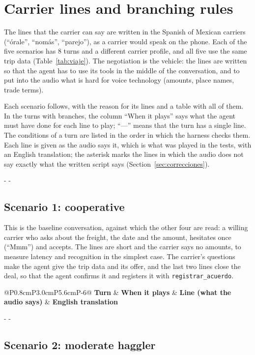 \documentclass[11pt]{article}
\makeatletter
\newcommand{\need}[1]{\par\penalty-100\begingroup
  \setlength{\dimen@}{#1}%
  \dimen@ii\pagegoal \advance\dimen@ii-\pagetotal
  \ifdim\dimen@>\dimen@ii \ifdim\dimen@ii>\z@\vfil\fi \penalty-\@M \fi
  \endgroup}
\newenvironment{scripttable}[2]{%
\begin{table}[H]
\centering
\caption{#1}
\label{#2}
\footnotesize
\renewcommand{\arraystretch}{1.15}
\setlength{\tabcolsep}{4pt}
\begin{tabular}{@{}P{0.8cm}P{3.0cm}P{5.6cm}P{\dimexpr\linewidth-9.4cm-6\tabcolsep\relax}@{}}
\toprule
\textbf{Turn} & \textbf{When it plays} & \textbf{Line (what the audio says)} & \textbf{English translation}\\
\midrule}{%
\bottomrule
\end{tabular}
\end{table}}
\makeatother
\begin{document}
\section{Carrier lines and branching rules}
\label{sec:lineas}

The \RGuionLineas{} lines that the carrier can say are written in the Spanish of
Mexican carriers (``órale'', ``nomás'', ``parejo''), as a carrier would speak on the
phone. Each of the five scenarios has 8 turns and a different carrier profile, and
all five use the same trip data (Table~\ref{tab:viaje}). The negotiation is the
vehicle: the lines are written so that the agent has to use its tools in the middle
of the conversation, and to put into the audio what is hard for voice technology
(amounts, place names, trade terms).

Each scenario follows, with the reason for its lines and a table with all of them.
In the turns with branches, the column ``When it plays'' says what the agent must
have done for each line to play; ``---'' means that the turn has a single line.
The conditions of a turn are listed in the order in which the harness checks them.
Each line is given as the audio says it, which is what was played in the tests,
with an English translation; the asterisk marks the lines in which the audio does
not say exactly what the written script says (Section~\ref{sec:correcciones}).

\need{9cm}
\subsection{Scenario 1: cooperative}

This is the baseline conversation, against which the other four are read: a willing
carrier who asks about the freight, the date and the amount, hesitates once
(``Mmm'') and accepts. The lines are short and the carrier says no amounts, to
measure latency and recognition in the simplest case. The carrier's questions make
the agent give the trip data and its offer, and the last two lines close the deal,
so that the agent confirms it and registers it with \texttt{registrar\_acuerdo}.

\begin{scripttable}{Scenario 1, cooperative: the carrier's lines.}{tab:guion-e1}
\end{scripttable}

\need{15cm}
\subsection{Scenario 2: moderate haggler}
\end{document}
